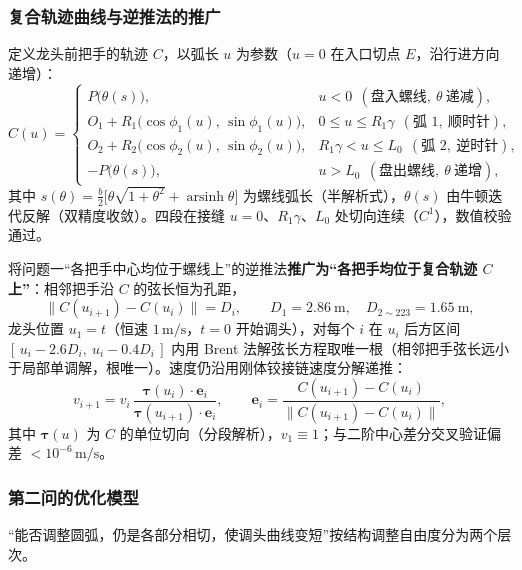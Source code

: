 ﻿\documentclass{cumcmthesis}
\begin{document}
\subsubsection{复合轨迹曲线与逆推法的推广}
定义龙头前把手的轨迹 $C$，以弧长 $u$ 为参数（$u=0$ 在入口切点 $E$，沿行进方向递增）：
\begin{equation}
C(u)=
\begin{cases}
P\bigl(\theta(s)\bigr), & u<0\ \ (\text{盘入螺线},\ \theta\ \text{递减}),\\[2pt]
O_1+R_1\bigl(\cos\phi_1(u),\,\sin\phi_1(u)\bigr), & 0\le u\le R_1\gamma\ \ (\text{弧 1},\ \text{顺时针}),\\[2pt]
O_2+R_2\bigl(\cos\phi_2(u),\,\sin\phi_2(u)\bigr), & R_1\gamma<u\le L_0\ \ (\text{弧 2},\ \text{逆时针}),\\[2pt]
-P\bigl(\theta(s)\bigr), & u>L_0\ \ (\text{盘出螺线},\ \theta\ \text{递增}),
\end{cases}
\end{equation}
其中 $s(\theta)=\tfrac{b}{2}\bigl[\theta\sqrt{1+\theta^2}+\operatorname{arsinh}\theta\bigr]$ 为螺线弧长（半解析式），$\theta(s)$ 由牛顿迭代反解（双精度收敛）。四段在接缝 $u=0$、$R_1\gamma$、$L_0$ 处切向连续（$C^1$），数值校验通过。

将问题一“各把手中心均位于螺线上”的逆推法\textbf{推广为“各把手均位于复合轨迹 $C$ 上”}：相邻把手沿 $C$ 的弦长恒为孔距，
\begin{equation}
\bigl\|C(u_{i+1})-C(u_i)\bigr\|=D_i,\qquad D_1=2.86\ \text{m},\quad D_{2\sim223}=1.65\ \text{m},
\end{equation}
龙头位置 $u_1=t$（恒速 $1\,\text{m/s}$，$t=0$ 开始调头），对每个 $i$ 在 $u_i$ 后方区间 $[\,u_i-2.6D_i,\ u_i-0.4D_i\,]$ 内用 Brent 法解弦长方程取唯一根（相邻把手弦长远小于局部单调解，根唯一）。速度仍沿用刚体铰接链速度分解递推：
\begin{equation}
v_{i+1}=v_i\,\frac{\boldsymbol{\tau}(u_i)\cdot\mathbf{e}_i}{\boldsymbol{\tau}(u_{i+1})\cdot\mathbf{e}_i},\qquad \mathbf{e}_i=\frac{C(u_{i+1})-C(u_i)}{\|C(u_{i+1})-C(u_i)\|},
\end{equation}
其中 $\boldsymbol{\tau}(u)$ 为 $C$ 的单位切向（分段解析），$v_1\equiv1$；与二阶中心差分交叉验证偏差 $<10^{-6}\,\text{m/s}$。

\subsubsection{第二问的优化模型}
“能否调整圆弧，仍是各部分相切，使调头曲线变短”按结构调整自由度分为两个层次。
\end{document}
